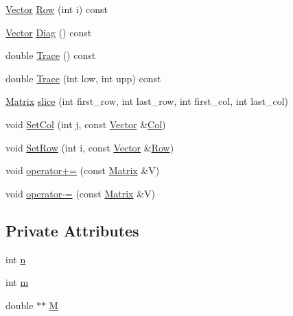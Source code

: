 \begin{DoxyCompactItemize}
\item 
\hyperlink{classVector}{Vector} \hyperlink{classMatrix_af11392830874339383f4449d6efc3e71}{Row} (int i) const 
\item 
\hyperlink{classVector}{Vector} \hyperlink{classMatrix_ae6b225896639ed624596fff9a01f0618}{Diag} () const 
\item 
double \hyperlink{classMatrix_a6b5f0679c723652340ff8316308854b7}{Trace} () const 
\item 
double \hyperlink{classMatrix_acdd5ac95adb5e5cbcd929342bf5aad29}{Trace} (int low, int upp) const 
\item 
\hyperlink{classMatrix}{Matrix} \hyperlink{classMatrix_a220d7f201c5dc597cd14530fe92402b0}{slice} (int first\-\_\-row, int last\-\_\-row, int first\-\_\-col, int last\-\_\-col)
\item 
void \hyperlink{classMatrix_ae9f1574a9cf6595c64ce1236a8003cd2}{Set\-Col} (int j, const \hyperlink{classVector}{Vector} \&\hyperlink{classMatrix_a02c825325655a07eb94e4a57478a4c18}{Col})
\item 
void \hyperlink{classMatrix_a308d1f64fcf50b39a26fa10a34657637}{Set\-Row} (int i, const \hyperlink{classVector}{Vector} \&\hyperlink{classMatrix_af11392830874339383f4449d6efc3e71}{Row})
\item 
void \hyperlink{classMatrix_a3ac5eee33c322def8e5979b931f09e12}{operator+=} (const \hyperlink{classMatrix}{Matrix} \&V)
\item 
void \hyperlink{classMatrix_a53793b2dda77eee2f6b648c5bf5f6686}{operator-\/=} (const \hyperlink{classMatrix}{Matrix} \&V)
\end{DoxyCompactItemize}
\subsection*{Private Attributes}
\begin{DoxyCompactItemize}
\item 
int \hyperlink{classMatrix_a6f755dbfbefb9b4ba6c2b3acea8932f2}{n}
\item 
int \hyperlink{classMatrix_af5435c7814eef8c12549d34e7be2184c}{m}
\item 
double $\ast$$\ast$ \hyperlink{classMatrix_a6809ed961617c63dfdea6ca953990b8f}{M}
\end{DoxyCompactItemize}
